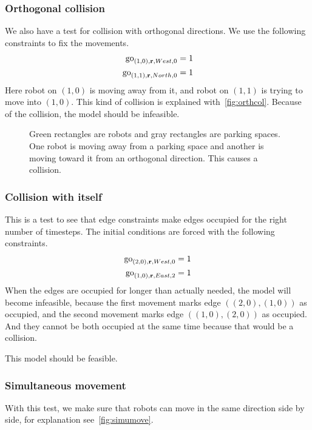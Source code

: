 \subsubsection{Orthogonal collision}
\label{sec:orthcoltest}
We also have a test for collision with orthogonal directions.
We use the following constraints to fix the movements.
\begin{align}
    \mathrm{go}_{(1,0),\text{\bf r},West,0} &= 1\\
    \mathrm{go}_{(1,1),\text{\bf r},North,0} &= 1
\end{align}
Here robot on $(1,0)$ is moving away from it, and robot on $(1,1)$ is trying to
move into $(1,0)$. This kind of collision is explained
with~\autoref{fig:orthcol}. Because of the collision, the model should be
infeasible.

\begin{figure}[h]
    \begin{center}
        
        \caption{Green rectangles are robots and gray rectangles are parking
            spaces. One robot is moving away from a parking space and another is
        moving toward it from an orthogonal direction. This causes a collision.}
        \label{fig:orthcol}
    \end{center}
\end{figure}

\subsubsection{Collision with itself}
This is a test to see that edge constraints make edges occupied for the right
number of timesteps. The initial conditions are forced with the following
constraints.
\begin{align}
    \mathrm{go}_{(2,0),\text{\bf r},West,0} &= 1\\
    \mathrm{go}_{(1,0),\text{\bf r},East,2} &= 1
\end{align}
When the edges are occupied for longer than actually needed, the model will
become infeasible, because the first movement marks edge $((2,0),(1,0))$ as
occupied, and the second movement marks edge $((1,0),(2,0))$ as occupied. And
they cannot be both occupied at the same time because that would be a
collision.

This model should be feasible.
\subsubsection{Simultaneous movement}
With this test, we make sure that robots can move in the same direction side by
side, for explanation see~\autoref{fig:simumove}.

